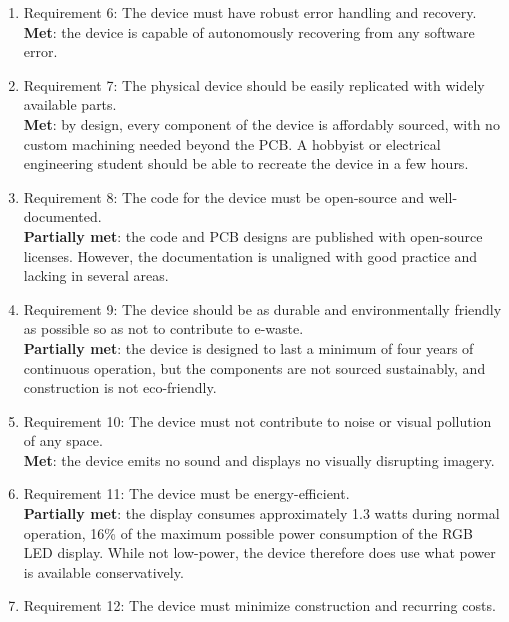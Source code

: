 \begin{enumerate}
            second to user input.
      \item Requirement 6: The device must have robust error handling and recovery. \\
            \textbf{Met}: the device is capable of autonomously recovering
            from any software error.
      \item Requirement 7: The physical device should be easily replicated with
            widely available parts. \\
            \textbf{Met}: by design, every component of the device is
            affordably sourced, with no custom machining needed beyond
            the PCB. A hobbyist or electrical engineering student
            should be able to recreate the device in a few hours.
      \item Requirement 8: The code for the device must be open-source and well-documented. \\
            \textbf{Partially met}: the code and PCB designs are
            published with open-source licenses. However, the
            documentation is unaligned with good practice and lacking in
            several areas.
      \item Requirement 9: The device should be as durable and
            environmentally friendly as possible so as
            not to contribute to e-waste. \\
            \textbf{Partially met}: the device is designed to last a
            minimum of four years of continuous operation, but the
            components are not sourced sustainably, and construction
            is not eco-friendly.
      \item Requirement 10: The device must not contribute to noise
            or visual pollution of any space. \\
            \textbf{Met}: the device emits no sound and displays
            no visually disrupting imagery.
      \item Requirement 11: The device must be energy-efficient. \\
            \textbf{Partially met}: the display consumes approximately 1.3 watts during
            normal operation, 16\% of the maximum possible power consumption of
            the RGB LED display. While not low-power, the device therefore
            does use what power is available conservatively.
      \item Requirement 12: The device must minimize
            construction and recurring costs. \\

\end{enumerate}

